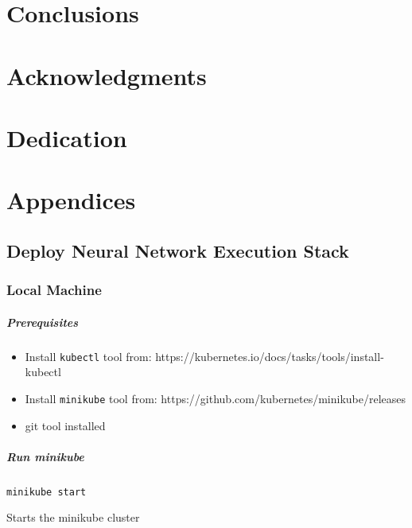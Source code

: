 \chapter{Conclusions}\label{conclusions}

\chapter{Acknowledgments}\label{acknowledgments}

\chapter{Dedication}\label{dedication}

\chapter{Appendices}\label{appendices}

\section{Deploy Neural Network Execution
Stack}\label{deploy-neural-network-execution-stack}

\subsection{Local Machine}\label{local-machine}

\paragraph{Prerequisites}\label{prerequisites-1}

\begin{itemize}
\tightlist
\item
  Install \texttt{kubectl} tool from:
  https://kubernetes.io/docs/tasks/tools/install-kubectl
\item
  Install \texttt{minikube} tool from:
  https://github.com/kubernetes/minikube/releases
\item
  git tool installed
\end{itemize}

\paragraph{Run minikube}\label{run-minikube}

\texttt{minikube\ start}

Starts the minikube cluster

